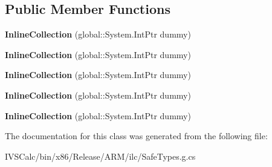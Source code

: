 \subsection*{Public Member Functions}
\begin{DoxyCompactItemize}
\item 
\mbox{\label{class_windows_1_1_u_i_1_1_xaml_1_1_documents_1_1_inline_collection_aa2582e3bc97a85c34becbdd8822f9515}} 
{\bfseries Inline\+Collection} (global\+::\+System.\+Int\+Ptr dummy)
\item 
\mbox{\label{class_windows_1_1_u_i_1_1_xaml_1_1_documents_1_1_inline_collection_aa2582e3bc97a85c34becbdd8822f9515}} 
{\bfseries Inline\+Collection} (global\+::\+System.\+Int\+Ptr dummy)
\item 
\mbox{\label{class_windows_1_1_u_i_1_1_xaml_1_1_documents_1_1_inline_collection_aa2582e3bc97a85c34becbdd8822f9515}} 
{\bfseries Inline\+Collection} (global\+::\+System.\+Int\+Ptr dummy)
\item 
\mbox{\label{class_windows_1_1_u_i_1_1_xaml_1_1_documents_1_1_inline_collection_aa2582e3bc97a85c34becbdd8822f9515}} 
{\bfseries Inline\+Collection} (global\+::\+System.\+Int\+Ptr dummy)
\item 
\mbox{\label{class_windows_1_1_u_i_1_1_xaml_1_1_documents_1_1_inline_collection_aa2582e3bc97a85c34becbdd8822f9515}} 
{\bfseries Inline\+Collection} (global\+::\+System.\+Int\+Ptr dummy)
\end{DoxyCompactItemize}


The documentation for this class was generated from the following file\+:\begin{DoxyCompactItemize}
\item 
I\+V\+S\+Calc/bin/x86/\+Release/\+A\+R\+M/ilc/Safe\+Types.\+g.\+cs\end{DoxyCompactItemize}
